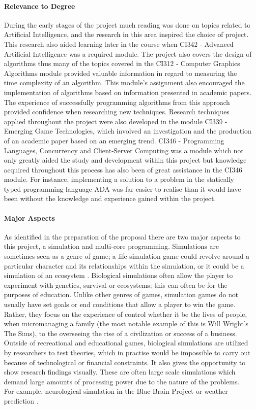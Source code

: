 \documentclass[main.tex]{subfiles}
\begin{document}
\paragraph{Relevance to Degree} During the early stages of the project much reading was done on topics related to Artificial Intelligence, and the research in this area inspired the choice of project. This research also aided learning later in the course when CI342 - Advanced Artificial Intelligence was a required module. The project also covers the design of algorithms thus many of the topics covered in the CI312 - Computer Graphics Algorithms module provided valuable information in regard to measuring the time complexity of an algorithm. This module's assignment also encouraged the implementation of algorithms based on information presented in academic papers. The experience of successfully programming algorithms from this approach provided confidence when researching new techniques. Research techniques applied throughout the project were also developed in the module CI339 - Emerging Game Technologies, which involved an investigation and the production of an academic paper based on an emerging trend. CI346 - Programming Languages, Concurrency and Client-Server Computing was a module which not only greatly aided the study and development within this project but knowledge acquired throughout this process has also been of great assistance in the CI346 module. For instance, implementing a solution to a problem in the statically typed programming language ADA was far easier to realise than it would have been without the knowledge and experience gained within the project.

\paragraph{Major Aspects}As identified in the preparation of the proposal there are two major aspects to this project, a simulation and multi-core programming. Simulations are sometimes seen as a genre of game; a life simulation game could revolve around a particular character and its relationships within the simulation, or it could be a simulation of an ecosystem \cite{Spore2009}. Biological simulations often allow the player to experiment with genetics, survival or ecosystems; this can often be for the purposes of education. Unlike other genres of games, simulation games do not usually have set goals or end conditions that allow a player to win the game. Rather, they focus on the experience of control whether it be the lives of people, when micromanaging a family (the most notable example of this is Will Wright's The Sims), to the overseeing the rise of a civilization or success of a business. Outside of recreational and educational games, biological simulations are utilized by researchers to test theories, which in practise would be impossible to carry out because of technological or financial constraints. It also gives the opportunity to show research findings visually. These are often large scale simulations which demand large amounts of processing power due to the nature of the problems. For example, neurological simulation in the Blue Brain Project\cite{Graham-Rowe2005} or weather prediction \cite{Michalakes2008}.
\end{document}
